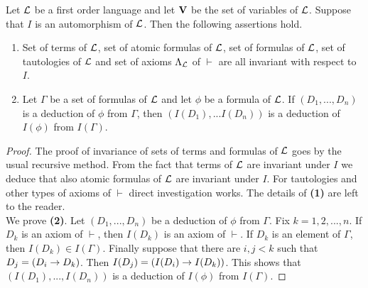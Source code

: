 \begin{theorem}\label{theorem:invariance_under_automorphisms}
Let ${\mathcal L}$ be a first order language and let $\mathbf{V}$ be the set of variables of ${\mathcal L}$. Suppose that $I$ is an automorphism of ${\mathcal L}$. Then the following assertions hold.
\begin{enumerate}[label=\textbf{\emph{(\arabic*)}}, leftmargin=3.0em]
\item Set of terms of ${\mathcal L}$, set of atomic formulas of ${\mathcal L}$, set of formulas of ${\mathcal L}$, set of tautologies of ${\mathcal L}$ and set of
axioms $\Lambda_{{\mathcal L}}$ of $\vdash$ are all invariant with respect to $I$.
\item Let $\Gamma$ be a set of formulas of ${\mathcal L}$ and let $\phi$ be a formula of ${\mathcal L}$. If $(D_1 , ..., D_n)$ is a deduction of $\phi$ from $\Gamma$, then $(I(D_1 ), ...I(D_n))$ is a deduction of $I(\phi)$ from $I(\Gamma)$.
\end{enumerate}
\end{theorem}
\begin{proof}
The proof of invariance of sets of terms and formulas of ${\mathcal L}$ goes by the usual recursive method. From the fact that terms of ${\mathcal L}$ are invariant under $I$ we deduce that also atomic formulas of ${\mathcal L}$ are invariant under $I$. For tautologies and other types of axioms of $\vdash$ direct investigation works. The details of \textbf{(1)} are left to the reader.\\
We prove \textbf{(2)}. Let $(D_1 , ..., D_n)$ be a deduction of $\phi$ from $\Gamma$. Fix $k=1, 2, ..., n$. If $D_k$ is an axiom of $\vdash$, then $I(D_k)$ is an axiom of $\vdash$. If $D_k$ is an element of $\Gamma$, then $I(D_k) \in I(\Gamma)$. Finally suppose that there are $i, j < k$ such that $D_j = (D_i \rightarrow D_k)$. Then $I(D_j) = \left(I(D_i) \rightarrow I(D_k)\right)$. This shows that $(I(D_1), ..., I(D_n))$ is a deduction of $I(\phi)$ from $I(\Gamma)$.
\end{proof}

